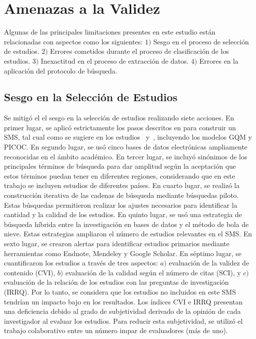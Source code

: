 \section{Amenazas a la Validez}
Algunas de las principales limitaciones presentes en este estudio están relacionadas con aspectos como los siguientes: $1)$ Sesgo en el proceso de selección de estudios. $2)$ Errores cometidos durante el proceso de clasificación de los estudios. $3)$ Inexactitud en el proceso de extracción de datos. $4)$ Errores en la aplicación del protocolo de búsqueda.


\subsection{Sesgo en la Selección de Estudios}
Se mitigó el el sesgo en la selección de estudios realizando siete acciones. En primer lugar, se aplicó estrictamente los pasos descritos en para construir un SMS, tal cual como se sugiere en los estudios~\cite{Runeson2009} y~\cite{Kitchenham2010}, incluyendo los modelos GQM y PICOC. En segundo lugar, se usó cinco bases de datos electrónicas ampliamente reconocidas en el ámbito académico. En tercer lugar, se incluyó sinónimos de los principales términos de búsqueda para dar amplitud según la aceptación que estos términos puedan tener en diferentes regiones, considerando que en este trabajo se incluyen estudios de diferentes países. En cuarto lugar, se realizó la construcción iterativa de las cadenas de búsqueda mediante búsquedas piloto. Estas búsquedas permitieron realizar los ajustes necesarios para identificar la cantidad y la calidad de los estudios. En quinto lugar, se usó una estrategia de búsqueda híbrida entre la investigación en bases de datos y el método de bola de nieve. Estas estrategias ampliaron el número de estudios relevantes en el SMS. En sexto lugar, se crearon alertas para identificar estudios primarios mediante herramientas como Endnote, Mendeley y Google Scholar. En séptimo lugar, se cuantificaron los estudios a través de tres aspectos: $a)$ evaluación de la validez de contenido (CVI), $b)$ evaluación de la calidad según el número de citas (SCI), y $c)$ evaluación de la relación de los estudios con las preguntas de investigación (IRRQ). Por lo tanto, se considera que los estudios no incluidos en este SMS tendrían un impacto bajo en los resultados. Los índices CVI e IRRQ presentan una deficiencia debido al grado de subjetividad derivado de la opinión de cada investigador al evaluar los estudios. Para reducir esta subjetividad, se utilizó el trabajo colaborativo entre un número impar de evaluadores (más de uno).

